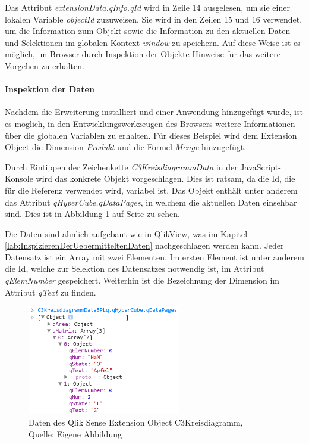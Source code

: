 Das Attribut \textit{extensionData.qInfo.qId} wird in Zeile 14 ausgelesen, um sie einer lokalen Variable \textit{objectId} zuzuweisen. Sie wird in den Zeilen 15 und 16 verwendet, um die Information zum Objekt sowie die Information zu den aktuellen Daten und Selektionen im globalen Kontext \textit{window} zu speichern. Auf diese Weise ist es möglich, im Browser durch Inspektion der Objekte Hinweise für das weitere Vorgehen zu erhalten.

\paragraph{Inspektion der Daten}


Nachdem die Erweiterung installiert und einer Anwendung hinzu\-gefügt wurde, ist es möglich, in den Entwicklungswerkzeugen des Browsers weitere Informationen über die globalen Variablen zu erhalten. Für dieses Beispiel wird dem Extension Object die Dimension \textit{Produkt} und die Formel \textit{Menge} hinzugefügt.

Durch Eintippen der Zeichenkette \textit{C3KreisdiagrammData} in der JavaScript-Konsole wird das konkrete Objekt vorgeschlagen. Dies ist ratsam, da die Id, die für die Referenz verwendet wird, variabel ist. Das Objekt enthält unter anderem das Attribut \textit{qHyperCube.qDataPages}, in welchem die aktuellen Daten einsehbar sind. Dies ist in Abbildung \ref{fig:qDataPages} auf Seite \pageref{fig:qDataPages} zu sehen.

Die Daten sind ähnlich aufgebaut wie in QlikView, was im Kapitel \ref{lab:InspizierenDerUebermitteltenDaten} nachgeschlagen werden kann. Jeder Daten\-satz ist ein Array mit zwei Elementen.
Im ersten Element ist unter anderem die Id, welche zur Selektion des Daten\-satzes notwendig ist, im Attribut \textit{qElemNumber} gespeichert. Weiterhin ist die Bezeichnung der Dimension im Attribut \textit{qText} zu finden. 

\begin{figure}
	\centering
		\includegraphics[width=0.60\textwidth]{img/QsDevTools/qDataPages.PNG}
	\caption[Daten des Qlik Sense Extension Object C3Kreisdiagramm]{Daten des Qlik Sense Extension Object C3Kreisdiagramm, \\Quelle: Eigene Abbildung}
	\label{fig:qDataPages}
\end{figure}


